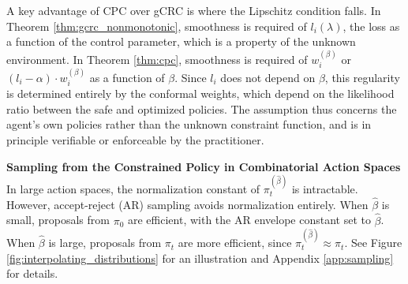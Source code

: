 A key advantage of CPC over gCRC is where the Lipschitz condition falls. In Theorem \ref{thm:gcrc_nonmonotonic}, smoothness is required of $l_i(\lambda)$, the loss as a function of the control parameter, which is a property of the unknown environment. In Theorem \ref{thm:cpc}, smoothness is required of $w_i^{(\beta)}$ or $(l_i - \alpha)\cdot w_i^{(\beta)}$ as a function of $\beta$. Since $l_i$ does not depend on $\beta$, this regularity is determined entirely by the conformal weights, which depend on the likelihood ratio between the safe and optimized policies. The assumption thus concerns the agent's own policies rather than the unknown constraint function, and is in principle verifiable or enforceable by the practitioner.


\textbf{Sampling from the Constrained Policy in Combinatorial Action Spaces}
In large action spaces, the normalization constant of $\pi_t^{(\hat\beta)}$ is intractable. However, accept-reject (AR) sampling \citep{von1963various} avoids normalization entirely. When $\hat\beta$ is small, proposals from $\pi_0$ are efficient, with the AR envelope constant set to $\hat\beta$. When $\hat\beta$ is large, proposals from $\pi_t$ are more efficient, since $\pi_t^{(\hat\beta)} \approx \pi_t$. See Figure \ref{fig:interpolating_distributions} for an illustration and Appendix \ref{app:sampling} for details.

